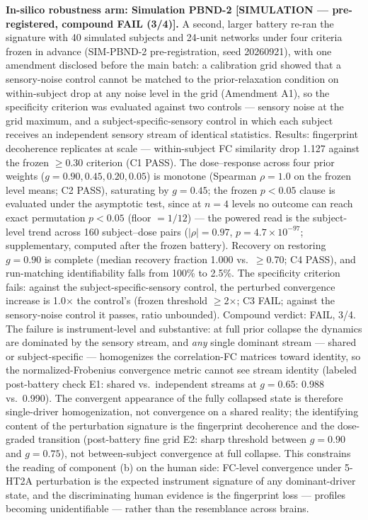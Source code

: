 \documentclass[11pt,twocolumn]{article}
\theoremstyle{plain}
\begin{document}
\textbf{In-silico robustness arm: Simulation PBND-2 [SIMULATION --- pre-registered, compound FAIL (3/4)].} A second, larger battery re-ran the signature with 40 simulated subjects and 24-unit networks under four criteria frozen in advance (SIM-PBND-2 pre-registration, seed 20260921), with one amendment disclosed before the main batch: a calibration grid showed that a sensory-noise control cannot be matched to the prior-relaxation condition on within-subject drop at any noise level in the grid (Amendment A1), so the specificity criterion was evaluated against two controls --- sensory noise at the grid maximum, and a subject-specific-sensory control in which each subject receives an independent sensory stream of identical statistics. Results: fingerprint decoherence replicates at scale --- within-subject FC similarity drop 1.127 against the frozen $\geq$0.30 criterion (C1 PASS). The dose--response across four prior weights ($g = 0.90, 0.45, 0.20, 0.05$) is monotone (Spearman $\rho = 1.0$ on the frozen level means; C2 PASS), saturating by $g = 0.45$; the frozen $p<0.05$ clause is evaluated under the asymptotic test, since at $n = 4$ levels no outcome can reach exact permutation $p < 0.05$ (floor $= 1/12$) --- the powered read is the subject-level trend across 160 subject--dose pairs ($|\rho| = 0.97$, $p = 4.7\times10^{-97}$; supplementary, computed after the frozen battery). Recovery on restoring $g = 0.90$ is complete (median recovery fraction 1.000 vs.\ $\geq$0.70; C4 PASS), and run-matching identifiability falls from 100\% to 2.5\%. The specificity criterion fails: against the subject-specific-sensory control, the perturbed convergence increase is 1.0$\times$ the control's (frozen threshold $\geq$2$\times$; C3 FAIL; against the sensory-noise control it passes, ratio unbounded). Compound verdict: FAIL, 3/4. The failure is instrument-level and substantive: at full prior collapse the dynamics are dominated by the sensory stream, and \emph{any} single dominant stream --- shared or subject-specific --- homogenizes the correlation-FC matrices toward identity, so the normalized-Frobenius convergence metric cannot see stream identity (labeled post-battery check E1: shared vs.\ independent streams at $g = 0.65$: 0.988 vs.\ 0.990). The convergent appearance of the fully collapsed state is therefore single-driver homogenization, not convergence on a shared reality; the identifying content of the perturbation signature is the fingerprint decoherence and the dose-graded transition (post-battery fine grid E2: sharp threshold between $g = 0.90$ and $g = 0.75$), not between-subject convergence at full collapse. This constrains the reading of component (b) on the human side: FC-level convergence under 5-HT2A perturbation is the expected instrument signature of any dominant-driver state, and the discriminating human evidence is the fingerprint loss --- profiles becoming unidentifiable --- rather than the resemblance across brains.
\end{document}
